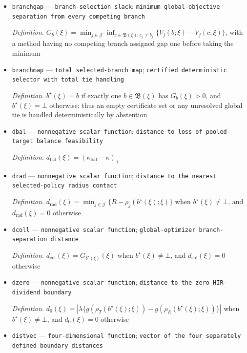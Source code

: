 \documentclass{article}
\begin{document}
\begin{itemize}
  \item \texttt{branchgap} --- \texttt{branch-\allowbreak{}selection slack}; \texttt{minimum global-\allowbreak{}objective separation from every competing branch}
  \par\smallskip\noindent\emph{Definition.} \(G_b(\xi)=\min_{j\in\mathcal J}\inf_{c\in\mathfrak B(\xi):c_j\ne b_j}\{V_j(b;\xi)-V_j(c;\xi)\}\), with a method having no competing branch assigned gap one before taking the minimum
  \item \texttt{branchmap} --- \texttt{total selected-\allowbreak{}branch map}; \texttt{certified deterministic selector with total tie handling}
  \par\smallskip\noindent\emph{Definition.} \(b^\star(\xi)=b\) if exactly one \(b\in\mathfrak B(\xi)\) has \(G_b(\xi)>0\), and \(b^\star(\xi)=\bot\) otherwise; thus an empty certificate set or any unresolved global tie is handled deterministically by abstention
  \item \texttt{dbal} --- \texttt{nonnegative scalar function}; \texttt{distance to loss of pooled-\allowbreak{}target balance feasibility}
  \par\smallskip\noindent\emph{Definition.} \(d_{\mathrm{bal}}(\xi)=(\kappa_{\mathrm{bal}}-\kappa)_+\)
  \item \texttt{drad} --- \texttt{nonnegative scalar function}; \texttt{distance to the nearest selected-\allowbreak{}policy radius contact}
  \par\smallskip\noindent\emph{Definition.} \(d_{\mathrm{rad}}(\xi)=\min_{j\in\mathcal J}\{R-\rho_j(b^\star(\xi);\xi)\}\) when \(b^\star(\xi)\ne\bot\), and \(d_{\mathrm{rad}}(\xi)=0\) otherwise
  \item \texttt{dcoll} --- \texttt{nonnegative scalar function}; \texttt{global-\allowbreak{}optimizer branch-\allowbreak{}separation distance}
  \par\smallskip\noindent\emph{Definition.} \(d_{\mathrm{col}}(\xi)=G_{b^\star(\xi)}(\xi)\) when \(b^\star(\xi)\ne\bot\), and \(d_{\mathrm{col}}(\xi)=0\) otherwise
  \item \texttt{dzero} --- \texttt{nonnegative scalar function}; \texttt{distance to the zero HIR-\allowbreak{}dividend boundary}
  \par\smallskip\noindent\emph{Definition.} \(d_0(\xi)=|\lambda\{g(\rho_T(b^\star(\xi);\xi))-g(\rho_E(b^\star(\xi);\xi))\}|\) when \(b^\star(\xi)\ne\bot\), and \(d_0(\xi)=0\) otherwise
  \item \texttt{distvec} --- \texttt{four-\allowbreak{}dimensional function}; \texttt{vector of the four separately defined boundary distances}

\end{itemize}
\end{document}
